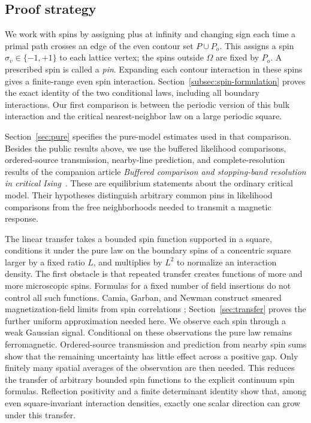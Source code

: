 \subsection{Proof strategy}

We work with spins by assigning plus at infinity and changing sign each
time a primal path crosses an edge of the even contour set \(P\cup P_o\).
This assigns a spin \(\sigma_v\in\{-1,+1\}\) to each lattice vertex;
the spins outside \(\Omega\) are fixed by \(P_o\). A prescribed spin
is called a \emph{pin}. Expanding each
contour interaction in these spins gives a finite-range even spin
interaction. Section~\ref{subsec:spin-formulation} proves the exact
identity of the two conditional laws, including all boundary interactions.
Our first comparison is between the periodic version of this bulk
interaction and the critical nearest-neighbor law on a large periodic
square.

Section~\ref{sec:pure} specifies the pure-model estimates used in that
comparison. Besides the public results above, we use the buffered
likelihood comparisons, ordered-source transmission, nearby-line
prediction, and complete-resolution results of the companion article
\emph{Buffered comparison and stopping-band resolution in critical
Ising}~\cite{OpenAIStatic2026}. These are equilibrium statements about
the ordinary critical model. Their hypotheses distinguish arbitrary
common pins in likelihood comparisons from the free neighborhoods
needed to transmit a magnetic response.

The linear transfer takes a bounded spin function supported in a square,
conditions it under the pure law on the boundary spins of a concentric square
larger by a fixed ratio \(L\), and multiplies by \(L^2\) to normalize
an interaction density. The first obstacle is that repeated transfer
creates functions of more and more microscopic spins. Formulas for a fixed number of field
insertions do not control all such functions. Camia, Garban, and Newman
construct smeared magnetization-field limits from spin correlations
\citep[Section~3]{CGN2015}; Section~\ref{sec:transfer} proves the further
uniform approximation needed here. We observe each spin through a weak
Gaussian signal. Conditional on these observations the pure law remains
ferromagnetic. Ordered-source transmission and prediction from nearby
spin sums show that the remaining uncertainty has little effect across
a positive gap. Only finitely many spatial averages of the observation
are then needed. This reduces the transfer of arbitrary bounded spin
functions to the explicit continuum spin formulas. Reflection positivity
and a finite determinant identity show that, among even square-invariant
interaction densities, exactly one scalar direction can grow under this
transfer.

